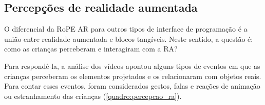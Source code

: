 

\subsection{Percepções de realidade aumentada}

O diferencial da RoPE AR para outros tipos de interface de programação é a união entre realidade aumentada e blocos tangíveis. Neste sentido, a questão é: como as crianças perceberam e interagiram com a RA?

Para respondê-la, a análise dos vídeos apontou alguns tipos de eventos em que as crianças perceberam os elementos projetados e os relacionaram com objetos reais. Para contar esses eventos, foram considerados gestos, falas e reações de animação ou estranhamento das crianças (\autoref{quadro:percepcao_ra}).

